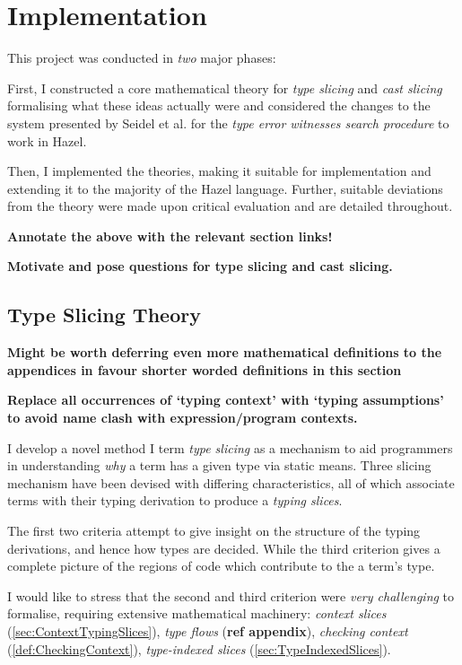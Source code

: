 \chapter{Implementation}\label{chap:Implementation}
This project was conducted in \textit{two} major phases:

First, I constructed a core mathematical theory for \textit{type slicing} and \textit{cast slicing} formalising what these ideas actually were and considered the changes to the system presented by Seidel et al. for the \textit{type error witnesses search procedure} to work in Hazel.  

Then, I implemented the theories, making it suitable for implementation and extending it to the majority of the Hazel language. Further, suitable deviations from the theory were made upon critical evaluation and are detailed throughout.

\textbf{Annotate the above with the relevant section links!}

\textbf{Motivate and pose questions for type slicing and cast slicing.}
\section{Type Slicing Theory}\label{sec:TypeSlicingTheory}
\textbf{Might be worth deferring even more mathematical definitions to the appendices in favour shorter worded definitions in this section}

\textbf{Replace all occurrences of `typing context' with `typing assumptions' to avoid name clash with expression/program contexts.}

I develop a novel method I term \textit{type slicing} as a mechanism to aid programmers in understanding \textit{why} a term has a given type via static means. Three slicing mechanism have been devised with differing characteristics, all of which associate terms with their typing derivation to produce a \textit{typing slices}. 

The first two criteria attempt to give insight on the structure of the typing derivations, and hence how types are decided. While the third criterion gives a complete picture of the regions of code which contribute to the a term's type.

I would like to stress that the second and third criterion were \textit{very challenging} to formalise, requiring extensive mathematical machinery: \textit{context slices} (\cref{sec:ContextTypingSlices}), \textit{type flows} (\textbf{ref appendix}), \textit{checking context} (\cref{def:CheckingContext}), \textit{type-indexed slices} (\cref{sec:TypeIndexedSlices}).

